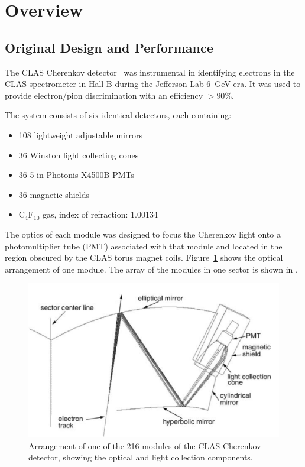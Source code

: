 \section{Overview}

\subsection{Original Design and Performance}

The CLAS Cherenkov detector~\cite{Adams:2001kk} was instrumental in identifying electrons in the CLAS spectrometer in Hall B during the Jefferson Lab 6~GeV era.
It was used to provide electron/pion discrimination with an efficiency $> 90\%$.

The system consists of six identical detectors, each containing:

\begin{itemize}
	\item 108 lightweight adjustable mirrors
	\item 36 Winston light collecting cones
	\item 36 5-in Photonis X4500B PMTs
	\item 36 magnetic shields
	\item C$_4$F$_{10}$ gas, index of refraction: 1.00134
\end{itemize}


The optics of each module was designed to focus the Cherenkov light onto a photomultiplier tube (PMT) associated
with that module and located in the region obscured by the CLAS torus magnet coils. Figure~\ref{fig:optics} shows
the optical arrangement of one module. The array of the modules in one sector is shown in .

\begin{figure}[ht]
	\centering
	\includegraphics[width=1.0\columnwidth,keepaspectratio]{img/optics.png}
	\caption{Arrangement of one of the 216 modules of the CLAS Cherenkov detector, showing the optical and
          light collection components.}
	\label{fig:optics}
\end{figure}

